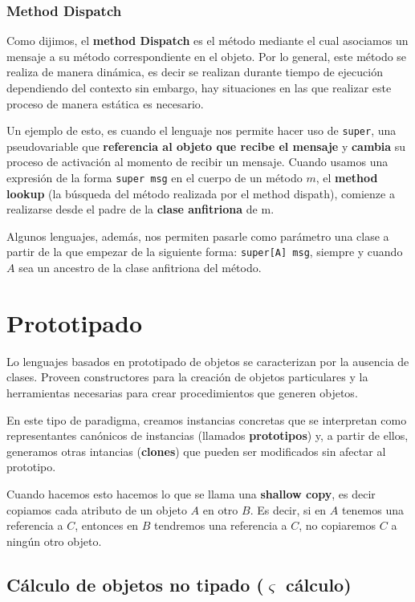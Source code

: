 \subsubsection{Method Dispatch}

Como dijimos, el \textbf{method Dispatch} es el método mediante el cual asociamos un mensaje a su método correspondiente en el objeto. Por lo general, este método se realiza de manera dinámica, es decir se realizan durante tiempo de ejecución dependiendo del contexto sin embargo, hay situaciones en las que realizar este proceso de manera estática es necesario. 

Un ejemplo de esto, es cuando el lenguaje nos permite hacer uso de \texttt{super}, una pseudovariable que \textbf{referencia al objeto que recibe el mensaje} y \textbf{cambia} su proceso de activación al momento de recibir un mensaje.
Cuando usamos una expresión de la forma \texttt{super msg} en el cuerpo de un método $m$, el \textbf{method lookup} (la búsqueda del método realizada por el method dispath), comienze a realizarse desde el padre de la \textbf{clase anfitriona} de m.

Algunos lenguajes, además, nos permiten pasarle como parámetro una clase a partir de la que empezar de la siguiente forma: \texttt{super[A] msg}, siempre y cuando $A$ sea un ancestro de la clase anfitriona del método.

\section{Prototipado}
Lo lenguajes basados en prototipado de objetos se caracterizan por la ausencia de clases. Proveen constructores para la creación de objetos particulares y la herramientas necesarias para crear procedimientos que generen objetos.

En este tipo de paradigma, creamos instancias concretas que se interpretan como representantes canónicos de instancias (llamados \textbf{prototipos}) y, a partir de ellos, generamos otras intancias (\textbf{clones}) que pueden ser modificados sin afectar al prototipo.

Cuando hacemos esto hacemos lo que se llama una \textbf{shallow copy}, es decir copiamos cada atributo de un objeto $A$ en otro $B$. Es decir, si en $A$ tenemos una referencia a $C$, entonces en $B$ tendremos una referencia a $C$, no copiaremos $C$ a ningún otro objeto.

\subsection{Cálculo de objetos no tipado \texorpdfstring{($\varsigma$ cálculo)}{}}



